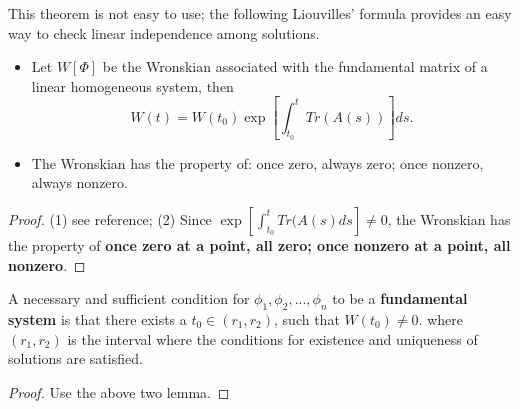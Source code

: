 \begin{refsection}
\begin{remark}
This theorem is not easy to use; the following Liouvilles' formula provides an easy way to check linear independence among solutions.
\end{remark}

\begin{lemma}
\cite[22]{sanchez1968ordinary}\cite[481]{meyer2000matrix}\hfill
\begin{itemize}
	\item Let $W[\Phi]$ be the Wronskian associated with the fundamental matrix of a linear homogeneous system, then
	$$W(t) = W(t_0)\exp[\int_{t_0}^t Tr(A(s))]ds.$$
	\item The Wronskian has the property of: once zero, always zero; once nonzero, always nonzero.
\end{itemize}
\end{lemma}
\begin{proof}
(1) see reference; (2) Since $\exp[\int_{t_0}^t Tr(A(s)ds] \neq 0$, the Wronskian has the property of \textbf{once zero at a point, all zero; once nonzero at a point, all nonzero}.
\end{proof}



\begin{theorem}
A necessary and sufficient condition for $\phi_1,\phi_2,...,\phi_n$ to be a \textbf{fundamental system} is
that there exists a $t_0 \in (r_1,r_2)$, such that $W(t_0)\neq 0$.
where $(r_1,r_2)$ is the interval where the conditions for existence and uniqueness of solutions are satisfied. 
\end{theorem}
\begin{proof}
Use the above two lemma.
\end{proof}


\end{refsection}

